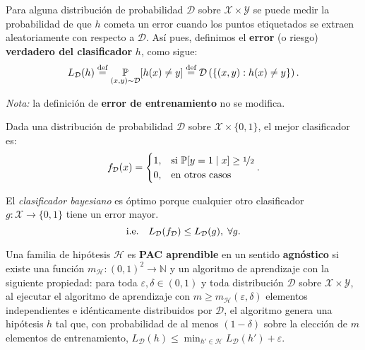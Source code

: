 \documentclass[8pt,a4paper]{extarticle}
\begin{document}
\begin{multicols}{3}
	\begin{boxdef}
		Para alguna distribución de probabilidad $\mathcal{D}$ sobre $\mathcal{X} \times \mathcal{Y}$ se puede medir la probabilidad de que $h$ cometa un error cuando los puntos etiquetados se extraen aleatoriamente con respecto a $\mathcal{D}$. Así pues, definimos el \textbf{error} (o riesgo) \textbf{verdadero del clasificador} $h$, como sigue:
		\[
			L_{\mathcal{D}}(h) \stackrel{\text{\normalfont def}}{=} \underset{(x,y)\sim \mathcal{D}}{\mathbb{P}} [h(x) \neq y] \stackrel{\text{\normalfont def}}{=} \mathcal{D}\left( \{(x, y) : h(x) \neq y\}  \right)
			.\]
	\end{boxdef}

	\emph{Nota:} la definición de \textbf{error de entrenamiento} no se modifica.

	\begin{boxdef}
		Dada una distribución de probabilidad $\mathcal{D}$ sobre $\mathcal{X} \times \{0, 1\} $, el mejor clasificador es:
		\[
			f_{\mathcal{D}}(x) = \begin{cases}
				1, & \text{\normalfont si } \mathbb{P}[y = 1  \mid x] \ge \nicefrac{1}{2} \\
				0, & \text{\normalfont en otros casos}
			\end{cases}
			.\]
	\end{boxdef}

	\begin{boxrmk}[]
		El \emph{clasificador bayesiano} es óptimo porque cualquier otro clasificador $g : \mathcal{X} \to \{0,1\} $ tiene un error mayor.
		\[
			\text{\normalfont i.e.} \quad L_{\mathcal{D}}(f_{\mathcal{D}}) \le L_{\mathcal{D}}(g), \; \forall g
			.\]
	\end{boxrmk}

	\begin{boxdef}
		Una familia de hipótesis $\mathcal{H}$ es \textbf{PAC aprendible} en un sentido \textbf{agnóstico} si existe una función $m_{\mathcal{H}} : (0,1)^2 \to \mathbb{N}$ y un algoritmo de aprendizaje con la siguiente propiedad: \textcolor{dred}{para toda $\varepsilon, \delta \in (0,1)$ y toda distribución $\mathcal{D}$ sobre $\mathcal{X} \times \mathcal{Y}$, al ejecutar el algoritmo de aprendizaje con $m \ge m_{\mathcal{H}} (\varepsilon, \delta)$ elementos independientes e idénticamente distribuidos por $\mathcal{D}$, el algoritmo genera una hipótesis $h$ tal que, con probabilidad de al menos  $(1 - \delta)$ sobre la elección de $m$ elementos de entrenamiento, $\displaystyle L_{\mathcal{D}} (h) \le \min_{h' \in \mathcal{H}} L_{\mathcal{D}} (h') + \varepsilon$.}
	\end{boxdef}


\end{multicols}
\end{document}
